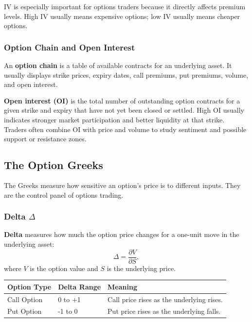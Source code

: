 \documentclass[12pt,openany]{book}
\begin{document}
IV is especially important for options traders because it directly affects premium levels. High IV usually means expensive options; low IV usually means cheaper options.

\subsubsection{Option Chain and Open Interest}

An \textbf{option chain} is a table of available contracts for an underlying asset. It usually displays strike prices, expiry dates, call premiums, put premiums, volume, and open interest.

\textbf{Open interest (OI)} is the total number of outstanding option contracts for a given strike and expiry that have not yet been closed or settled. High OI usually indicates stronger market participation and better liquidity at that strike. Traders often combine OI with price and volume to study sentiment and possible support or resistance zones.

\subsection{The Option Greeks}

The Greeks measure how sensitive an option's price is to different inputs. They are the control panel of options trading.

\subsubsection{Delta \(\Delta\)}

\textbf{Delta} measures how much the option price changes for a one-unit move in the underlying asset:
\begin{equation*}
    \Delta = \frac{\partial V}{\partial S},
\end{equation*}
where \(V\) is the option value and \(S\) is the underlying price.

\begin{center}
\small
\begin{tabular}{|L{4cm}|L{4cm}|L{6cm}|}
\hline
\textbf{Option Type} & \textbf{Delta Range} & \textbf{Meaning} \\
\hline
Call Option & 0 to +1 & Call price rises as the underlying rises. \\
\hline
Put Option & -1 to 0 & Put price rises as the underlying falls. \\
\hline
\end{tabular}
\end{center}
\end{document}
